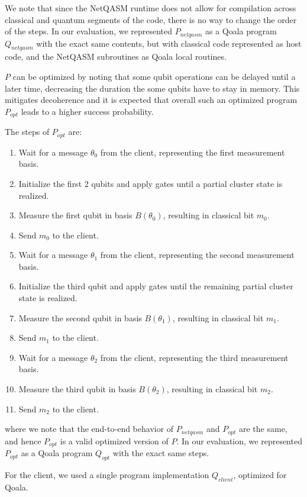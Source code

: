 We note that since the NetQASM runtime does not allow for compilation across classical and quantum segments of the code,
there is no way to change the order of the steps.
In our evaluation, we represented $P_{netqasm}$ as a Qoala program $Q_{netqasm}$ with the exact same contents, but with classical code represented as host code, and the NetQASM subroutines as Qoala local routines.

$P$ can be optimized by noting that some qubit operations can be delayed until a later time, decreasing the duration the some qubits have to stay in memory.
This mitigates decoherence and it is expected that overall such an optimized program $P_{opt}$ leads to a higher success probability.

The steps of $P_{opt}$ are:
\begin{enumerate}
  \item Wait for a message $\theta_0$ from the client, representing the first measurement basis.
  \item Initialize the first 2 qubits and apply gates until a partial cluster state is realized.
  \item Measure the first qubit in basis $B(\theta_0)$, resulting in classical bit $m_0$.
  \item Send $m_0$ to the client.
  \item Wait for a message $\theta_1$ from the client, representing the second measurement basis.
  \item Initialize the third qubit and apply gates until the remaining partial cluster state is realized.
  \item Measure the second qubit in basis $B(\theta_1)$, resulting in classical bit $m_1$.
  \item Send $m_1$ to the client.
  \item Wait for a message $\theta_2$ from the client, representing the third measurement basis.
  \item Measure the third qubit in basis $B(\theta_2)$, resulting in classical bit $m_2$.
  \item Send $m_2$ to the client.
\end{enumerate}
where we note that the end-to-end behavior of $P_{netqasm}$ and $P_{opt}$ are the same, and hence $P_{opt}$ is a valid optimized version of $P$.
In our evaluation, we represented $P_{opt}$ as a Qoala program $Q_{opt}$ with the exact same steps.

For the client, we used a single program implementation $Q_{client}$, optimized for Qoala.

